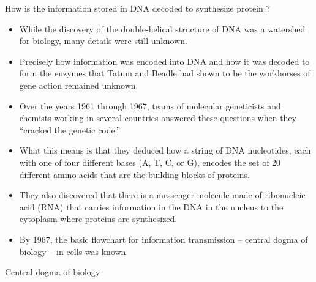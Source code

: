 \documentclass[11pt,dvipsnames,ignorenonframetext,aspectratio=169]{beamer}
\providecommand{\tightlist}{%
  \setlength{\itemsep}{0pt}\setlength{\parskip}{0pt}}
\begin{document}
\begin{frame}{How is the information stored in DNA decoded to synthesize
protein ?}
\protect\hypertarget{how-is-the-information-stored-in-dna-decoded-to-synthesize-protein}{}
\begin{itemize}
\tightlist
\item
  While the discovery of the double-helical structure of DNA was a
  watershed for biology, many details were still unknown.
\item
  Precisely how information was encoded into DNA and how it was decoded
  to form the enzymes that Tatum and Beadle had shown to be the
  workhorses of gene action remained unknown.
\item
  Over the years 1961 through 1967, teams of molecular geneticists and
  chemists working in several countries answered these questions when
  they ``cracked the genetic code.''
\end{itemize}
\end{frame}

\begin{frame}{}
\protect\hypertarget{section-1}{}
\begin{itemize}
\tightlist
\item
  What this means is that they deduced how a string of DNA nucleotides,
  each with one of four different bases (A, T, C, or G), encodes the set
  of 20 different amino acids that are the building blocks of proteins.
\item
  They also discovered that there is a messenger molecule made of
  ribonucleic acid (RNA) that carries information in the DNA in the
  nucleus to the cytoplasm where proteins are synthesized.
\item
  By 1967, the basic flowchart for information transmission -- central
  dogma of biology -- in cells was known.
\end{itemize}
\end{frame}

\begin{frame}{Central dogma of biology}
\protect\hypertarget{central-dogma-of-biology}{}
\end{frame}
\end{document}
